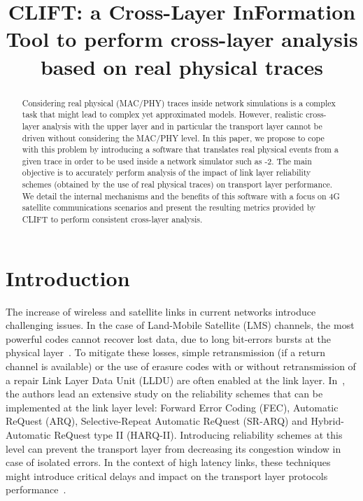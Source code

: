 \documentclass[conference,letterpaper]{IEEEtran}
\begin{document}
\title{CLIFT: a Cross-Layer InFormation Tool to perform cross-layer analysis based on real physical traces}  

\author{
}

\maketitle

\begin{abstract}
Considering real physical (MAC/PHY) traces inside network simulations is a complex task that might lead to complex yet approximated models.
However, realistic cross-layer analysis with the upper layer and in particular the transport layer cannot be driven without considering the MAC/PHY level.
In this paper, we propose to cope with this problem by introducing a software that translates real physical events from a given trace in order to be used inside a network simulator such as -2.
The main objective is to accurately perform analysis of the impact of link layer reliability schemes (obtained by the use of real physical traces) on transport layer performance. 
We detail the internal mechanisms and the benefits of this software with a focus on 4G satellite communications scenarios and present the resulting metrics provided by CLIFT to perform consistent cross-layer analysis.
\end{abstract}

\section{Introduction}
\label{sec::introduction}


The increase of wireless and satellite links in current networks introduce challenging issues. In the case of Land-Mobile Satellite (LMS) channels, the most powerful codes cannot recover lost data, due to long bit-errors bursts at the physical layer~\cite{lms_state}. To mitigate these losses, simple retransmission (if a return channel is available) or the use of erasure codes with or without retransmission of a repair Link Layer Data Unit (LLDU) are often enabled at the link layer. In~\cite{link_layer_rel}, the authors lead an extensive study on the reliability schemes that can be implemented at the link layer level: Forward Error Coding (FEC), Automatic ReQuest (ARQ), Selective-Repeat Automatic ReQuest (SR-ARQ) and Hybrid-Automatic ReQuest type II (HARQ-II). Introducing reliability schemes at this level can prevent the transport layer from decreasing its congestion window in case of isolated errors. In the context of high latency links, these techniques might introduce critical delays and impact on the transport layer protocols performance~\cite{high_bd_del_prod}. 
\end{document}
